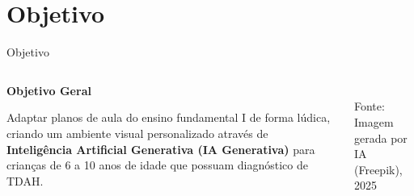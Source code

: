 \documentclass{beamer}
\begin{document}

\section{Objetivo}
\begin{frame}{Objetivo}
    \begin{columns}[T]
        \begin{column}{0.6\textwidth}
            \begin{tcolorbox}[
                enhanced, colback=white, colframe=cpsred, arc=5mm, boxrule=1.2pt, sharp corners=downhill, width=\linewidth, center, fontupper=\justifying\large, left=10pt, right=10pt, top=10pt, bottom=10pt, shadow={1mm}{-1mm}{0mm}{cpsgray!40},
            ]
                \textbf{\color{cpsred}Objetivo Geral}\par\vspace{0.3cm}
                Adaptar planos de aula do ensino fundamental I de forma lúdica, 
                criando um ambiente visual personalizado através de 
                \textbf{Inteligência Artificial Generativa (IA Generativa)} 
                para crianças de 6 a 10 anos de idade que possuam diagnóstico de TDAH.
            \end{tcolorbox}
        \end{column}
        \begin{column}{0.35\textwidth}
            \centering
            \\[0.3cm]
            \tiny\textcolor{cpsgray}{Fonte: Imagem gerada por IA (Freepik), 2025}
        \end{column}
    \end{columns}
\end{frame}
\end{document}

